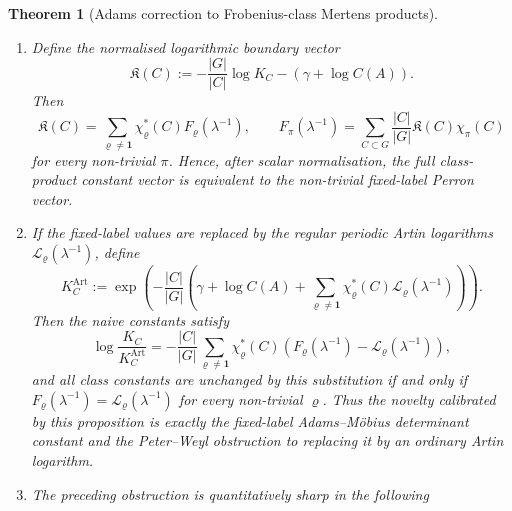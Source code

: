\documentclass[11pt,a4paper]{amsart}
\theoremstyle{plain}
\newtheorem{theorem}{Theorem}[section]
\theoremstyle{definition}
\theoremstyle{remark}
\DeclareMathOperator{\Irr}{Irr}
\begin{document}
\begin{theorem}[Adams correction to Frobenius-class Mertens products]
\begin{enumerate}[label=\textup{(\Alph*)}]
\begin{enumerate}[label=\textup{(\roman*)}]
\[          \chi_\varrho^\ast(C)F_\varrho(\lambda^{-1})
      \right);
    \]
    \item the determinant expression obtained from
    \eqref{eq:fixed-label-determinant-perron} after substituting
    \[
      F_\varrho(\lambda^{-1})
      =
      \sum_{r,m\ge1}\frac{\mu(m)}{rm}
        \sum_{\substack{\pi\in\Irr(G)\\(r,m,\pi)\ne(1,1,\mathbf1)}}
          a_{\varrho,\pi}^{(m)}
          \log\det(I-\lambda^{-rm}A_\pi)^{-1}.
      \]
    \end{enumerate}
    \item Define the normalised logarithmic boundary vector
    \[
      \mathfrak K(C)
      :=-
      \frac{|G|}{|C|}\log K_C-(\gamma+\log C(A)).
    \]
    Then
    \begin{equation}\label{eq:comparison-fixed-label-inverse}
      \mathfrak K(C)=
      \sum_{\varrho\ne\mathbf1}
        \chi_\varrho^\ast(C)F_\varrho(\lambda^{-1}),
      \qquad
      F_\pi(\lambda^{-1})=
      \sum_{C\subset G}\frac{|C|}{|G|}\mathfrak K(C)\chi_\pi(C)
    \end{equation}
    for every non-trivial \(\pi\).  Hence, after scalar normalisation, the
    full class-product constant vector is equivalent to the non-trivial
    fixed-label Perron vector.
    \item If the fixed-label values are replaced by the regular periodic
    Artin logarithms \(\mathcal L_\varrho(\lambda^{-1})\), define
    \[
      K_C^{\mathrm{Art}}
      :=
      \exp\!\left(
        -\frac{|C|}{|G|}
        \left(
          \gamma+\log C(A)
          +\sum_{\varrho\neq\mathbf1}
            \chi_\varrho^\ast(C)\mathcal L_\varrho(\lambda^{-1})
        \right)
      \right).
    \]
    Then the naive constants satisfy
    \begin{equation}\label{eq:comparison-artin-error}
      \log\frac{K_C}{K_C^{\mathrm{Art}}}
      =
      -\frac{|C|}{|G|}
        \sum_{\varrho\neq\mathbf1}
          \chi_\varrho^\ast(C)
          \left(F_\varrho(\lambda^{-1})-
          \mathcal L_\varrho(\lambda^{-1})\right),
    \end{equation}
    and all class constants are unchanged by this substitution if and only if
    \(F_\varrho(\lambda^{-1})=\mathcal L_\varrho(\lambda^{-1})\) for every
    non-trivial \(\varrho\).  Thus the novelty calibrated by this proposition
    is exactly the fixed-label Adams--M\"obius determinant constant and the
    Peter--Weyl obstruction to replacing it by an ordinary Artin logarithm.
    \item The preceding obstruction is quantitatively sharp in the following

\end{enumerate}
\end{theorem}
\end{document}
